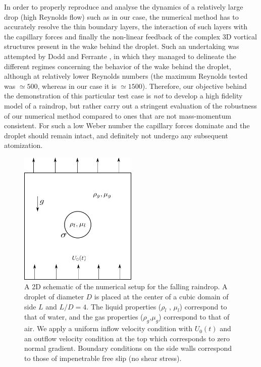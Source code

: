 In order to properly reproduce and analyse the dynamics 
of a relatively large drop (high Reynolds flow) such as in our case, 
the numerical method has to accurately resolve the thin boundary layers, 
the interaction of such layers with the capillary forces and finally 
the non-linear feedback of the complex 
3D vortical structures present in the wake behind the droplet. 
Such an undertaking was attempted by Dodd and Ferrante \cite{dodd2014}, 
in which they managed to delineate the different regimes concerning the 
behavior of the wake behind the droplet, although at relatively 
lower Reynolds numbers (the maximum Reynolds tested was $\simeq 500$, 
whereas in our case it is $\simeq 1500$).    
Therefore, our objective behind the demonstration of this particular 
test case is \textit{not} to develop a high fidelity model of a raindrop, 
but rather carry out a stringent evaluation of the robustness of our numerical 
method compared to ones that are not mass-momentum consistent. 
For such a low Weber number the capillary forces dominate and the 
droplet should remain intact, and definitely not undergo any subsequent atomization. 


\begin{figure}[h!]
\begin{center}
\includegraphics[width=0.5\textwidth]{plots/raindrop/setup.png}
\end{center}
\caption{A 2D schematic of the numerical setup for the falling raindrop. 
	A droplet of diameter $D$ is placed at the center of a cubic domain 
	of side $L$ and $L/D = 4$. The liquid properties ($\rho_l$ , $\mu_l$) 
	correspond to that of water, and the gas properties ($\rho_g$,$\mu_g$) 
	correspond to that of air. We apply a uniform inflow velocity condition 
	with $U_0(t)$ and an outflow velocity condition at the top which 
	corresponds to zero normal gradient.
	Boundary conditions on the side walls correspond 
	to those of impenetrable free slip (no shear stress).}
\label{setup}
\end{figure}

